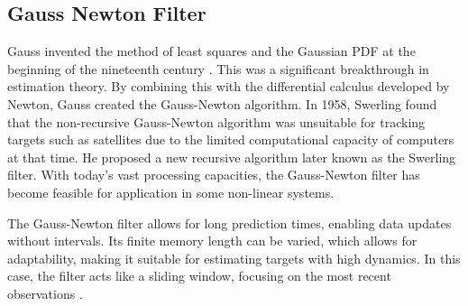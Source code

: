 \subsection{Gauss Newton Filter}
Gauss invented the method of least squares and the Gaussian \ac{PDF} at the beginning of the nineteenth century \cite{Zhichao2018}. This was a significant breakthrough in estimation theory. By combining this with the differential calculus developed by Newton, Gauss created the Gauss-Newton algorithm.
In 1958, Swerling \cite{Zhichao2018} found that the non-recursive Gauss-Newton algorithm was unsuitable for tracking targets such as satellites due to the limited computational capacity of computers at that time. He proposed a new recursive algorithm later known as the Swerling filter. With today's vast processing capacities, the Gauss-Newton filter has become feasible for application in some non-linear systems.

The Gauss-Newton filter allows for long prediction times, enabling data updates without intervals. Its finite memory length can be varied, which allows for adaptability, making it suitable for estimating targets with high dynamics. In this case, the filter acts like a sliding window, focusing on the most recent 
observations \cite{nmorris2013}. 

